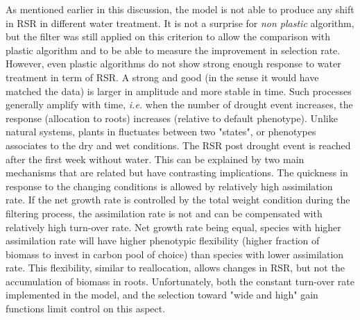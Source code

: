 As mentioned earlier in this discussion, the model is not able to produce any shift in RSR in different water treatment. It is not a surprise for \textit{non plastic} algorithm, but the filter was still applied on this criterion to allow the comparison with plastic algorithm and to be able to measure the improvement in selection rate. However, even plastic algorithms do not show strong enough response to water treatment in term of RSR. A strong and good (in the sense it would have matched the data) is larger in amplitude and more stable in time. Such processes generally amplify with time, \textit{i.e.} when the number of drought event increases, the response (allocation to roots) increases (relative to default phenotype). Unlike natural systems, plants in \model fluctuates between two "states", or phenotypes associates to the dry and wet conditions. The RSR post drought event is reached after the first week without water. This can be explained by two main mechanisms that are related but have contrasting implications. The quickness in response to the changing conditions is allowed by relatively high assimilation rate. If the net growth rate is controlled by the total weight condition during the filtering process, the assimilation rate is not and can be compensated with relatively high turn-over rate. Net growth rate being equal, species with higher assimilation rate will have higher phenotypic flexibility (higher fraction of biomass to invest in carbon pool of choice) than species with lower assimilation rate. This flexibility, similar to reallocation, allows changes in RSR, but not the accumulation of biomass in roots. Unfortunately, both the constant turn-over rate implemented in the model, and the selection toward "wide and high" gain functions limit control on this aspect.

